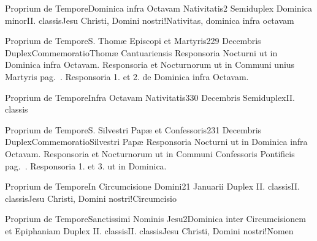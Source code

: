 \documentclass[liber-responsorialis_hiemalis.tex]{subfiles}
\begin{document}
	{Proprium de Tempore}{Dominica infra Octavam Nativitatis}{2}{}
	{Semiduplex Dominica minor}{II. classis}{Jesu Christi, Domini nostri!Nativitas, dominica infra octavam}
	{}
	{}

	{Proprium de Tempore}{S. Thomæ Episcopi et Martyris}{2}{29 Decembris}
	{Duplex}{Commemoratio}{Thomæ Cantuariensis}
	{Responsoria  Nocturni ut in Dominica infra Octavam.
		Responsoria  et  Nocturnorum ut in Communi unius Martyris pag.\ \pageref{M-UMEXN2R1}. 
	}
	{Responsoria 1. et 2. de Dominica infra Octavam.}

	{Proprium de Tempore}{Infra Octavam Nativitatis}{3}{30 Decembris}
	{Semiduplex}{II. classis}
	{}
	{}

	{Proprium de Tempore}{S. Silvestri Papæ et Confessoris}{2}{31 Decembris}
	{Duplex}{Commemoratio}{Silvestri Papæ}
	{Responsoria  Nocturni ut in Dominica infra Octavam.
		Responsoria  et  Nocturnorum ut in Communi Confessoris Pontificis pag.\ \pageref{M-COPON2R1}. 
	}
	{Responsoria 1. et 3. ut in Dominica.}

	{Proprium de Tempore}{In Circumcisione Domini}{2}{1 Januarii}
	{Duplex II. classis}{II. classis}{Jesu Christi, Domini nostri!Circumcisio}
	{}
	{}

	{Proprium de Tempore}{Sanctissimi Nominis Jesu}{2}{Dominica inter Circumcisionem et Epiphaniam}
	{Duplex II. classis}{II. classis}{Jesu Christi, Domini nostri!Nomen}
	{}
	{}
\end{document}
